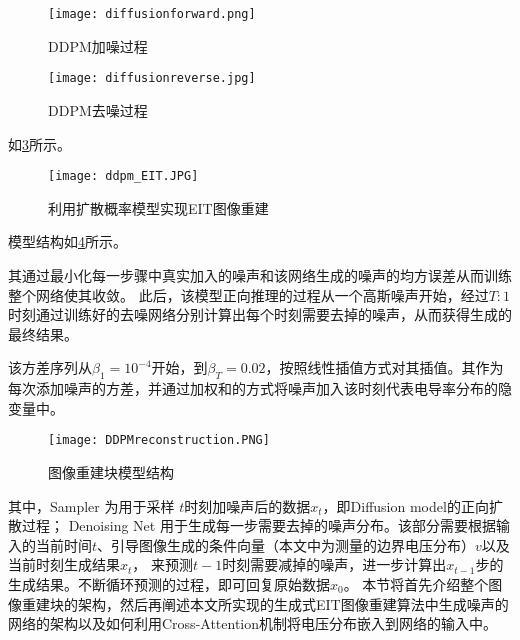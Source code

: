 \begin{figure}[h]
  \texttt{[image: diffusionforward.png]}
  \caption{DDPM加噪过程}
  \label{figure:Diffusionforward}
\end{figure}

\begin{figure}[h]
  \centering
  \texttt{[image: diffusionreverse.jpg]}
  \caption{DDPM去噪过程}
  \label{figure:Diffusionreverse}
\end{figure}



如\cref{figure:ddpm_EIT}所示。

\begin{figure}[h]
    \centering
    \texttt{[image: ddpm\_EIT.JPG]}
    \caption{利用扩散概率模型实现EIT图像重建}
    \label{figure:ddpm_EIT}
\end{figure}



模型结构如\cref{figure:DDPMreconstruction}所示。



其通过最小化每一步骤中真实加入的噪声和该网络生成的噪声的均方误差从而训练整个网络使其收敛。
此后，该模型正向推理的过程从一个高斯噪声开始，经过$T:1$时刻通过训练好的去噪网络分别计算出每个时刻需要去掉的噪声，从而获得生成的最终结果。






该方差序列从$\beta_1 = 10^{-4}$开始，到$\beta_T = 0.02$，按照线性插值方式对其插值。其作为每次添加噪声的方差，并通过加权和的方式将噪声加入该时刻代表电导率分布的隐变量中。


\begin{figure}[h]
    \centering
    \texttt{[image: DDPMreconstruction.PNG]}
    \caption{图像重建块模型结构}
    \label{figure:DDPMreconstruction}
\end{figure}


其中，Sampler 为用于采样 $t$时刻加噪声后的数据$x_t$，即Diffusion model的正向扩散过程；
Denoising Net 用于生成每一步需要去掉的噪声分布。该部分需要根据输入的当前时间$t$、引导图像生成的条件向量（本文中为测量的边界电压分布）$v$以及当前时刻生成结果$x_t$，
来预测$t-1$时刻需要减掉的噪声，进一步计算出$x_{t-1}$步的生成结果。不断循环预测的过程，即可回复原始数据$x_0$。
本节将首先介绍整个图像重建块的架构，然后再阐述本文所实现的生成式EIT图像重建算法中生成噪声的网络的架构以及如何利用Cross-Attention机制将电压分布嵌入到网络的输入中。








